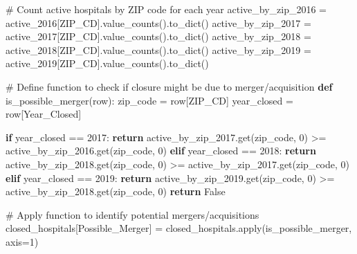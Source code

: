 \documentclass[
  letterpaper,
  DIV=11,
  numbers=noendperiod]{scrartcl}
\newenvironment{Shaded}{\begin{snugshade}}{\end{snugshade}}
\newcommand{\BuiltInTok}[1]{\textcolor[rgb]{0.00,0.23,0.31}{#1}}
\newcommand{\CommentTok}[1]{\textcolor[rgb]{0.37,0.37,0.37}{#1}}
\newcommand{\ControlFlowTok}[1]{\textcolor[rgb]{0.00,0.23,0.31}{\textbf{#1}}}
\newcommand{\DecValTok}[1]{\textcolor[rgb]{0.68,0.00,0.00}{#1}}
\newcommand{\KeywordTok}[1]{\textcolor[rgb]{0.00,0.23,0.31}{\textbf{#1}}}
\newcommand{\NormalTok}[1]{\textcolor[rgb]{0.00,0.23,0.31}{#1}}
\newcommand{\OperatorTok}[1]{\textcolor[rgb]{0.37,0.37,0.37}{#1}}
\newcommand{\StringTok}[1]{\textcolor[rgb]{0.13,0.47,0.30}{#1}}
\newcommand{\VariableTok}[1]{\textcolor[rgb]{0.07,0.07,0.07}{#1}}
\begin{document}
\begin{Shaded}
\begin{Highlighting}[]
\CommentTok{\# Count active hospitals by ZIP code for each year}
\NormalTok{active\_by\_zip\_2016 }\OperatorTok{=}\NormalTok{ active\_2016[}\StringTok{\textquotesingle{}ZIP\_CD\textquotesingle{}}\NormalTok{].value\_counts().to\_dict()}
\NormalTok{active\_by\_zip\_2017 }\OperatorTok{=}\NormalTok{ active\_2017[}\StringTok{\textquotesingle{}ZIP\_CD\textquotesingle{}}\NormalTok{].value\_counts().to\_dict()}
\NormalTok{active\_by\_zip\_2018 }\OperatorTok{=}\NormalTok{ active\_2018[}\StringTok{\textquotesingle{}ZIP\_CD\textquotesingle{}}\NormalTok{].value\_counts().to\_dict()}
\NormalTok{active\_by\_zip\_2019 }\OperatorTok{=}\NormalTok{ active\_2019[}\StringTok{\textquotesingle{}ZIP\_CD\textquotesingle{}}\NormalTok{].value\_counts().to\_dict()}

\CommentTok{\# Define function to check if closure might be due to merger/acquisition}
\KeywordTok{def}\NormalTok{ is\_possible\_merger(row):}
\NormalTok{    zip\_code }\OperatorTok{=}\NormalTok{ row[}\StringTok{\textquotesingle{}ZIP\_CD\textquotesingle{}}\NormalTok{]}
\NormalTok{    year\_closed }\OperatorTok{=}\NormalTok{ row[}\StringTok{\textquotesingle{}Year\_Closed\textquotesingle{}}\NormalTok{]}
    
    \ControlFlowTok{if}\NormalTok{ year\_closed }\OperatorTok{==} \DecValTok{2017}\NormalTok{:}
        \ControlFlowTok{return}\NormalTok{ active\_by\_zip\_2017.get(zip\_code, }\DecValTok{0}\NormalTok{) }\OperatorTok{\textgreater{}=}\NormalTok{ active\_by\_zip\_2016.get(zip\_code, }\DecValTok{0}\NormalTok{)}
    \ControlFlowTok{elif}\NormalTok{ year\_closed }\OperatorTok{==} \DecValTok{2018}\NormalTok{:}
        \ControlFlowTok{return}\NormalTok{ active\_by\_zip\_2018.get(zip\_code, }\DecValTok{0}\NormalTok{) }\OperatorTok{\textgreater{}=}\NormalTok{ active\_by\_zip\_2017.get(zip\_code, }\DecValTok{0}\NormalTok{)}
    \ControlFlowTok{elif}\NormalTok{ year\_closed }\OperatorTok{==} \DecValTok{2019}\NormalTok{:}
        \ControlFlowTok{return}\NormalTok{ active\_by\_zip\_2019.get(zip\_code, }\DecValTok{0}\NormalTok{) }\OperatorTok{\textgreater{}=}\NormalTok{ active\_by\_zip\_2018.get(zip\_code, }\DecValTok{0}\NormalTok{)}
    \ControlFlowTok{return} \VariableTok{False}

\CommentTok{\# Apply function to identify potential mergers/acquisitions}
\NormalTok{closed\_hospitals[}\StringTok{\textquotesingle{}Possible\_Merger\textquotesingle{}}\NormalTok{] }\OperatorTok{=}\NormalTok{ closed\_hospitals.}\BuiltInTok{apply}\NormalTok{(is\_possible\_merger, axis}\OperatorTok{=}\DecValTok{1}\NormalTok{)}


\end{Highlighting}
\end{Shaded}
\end{document}
